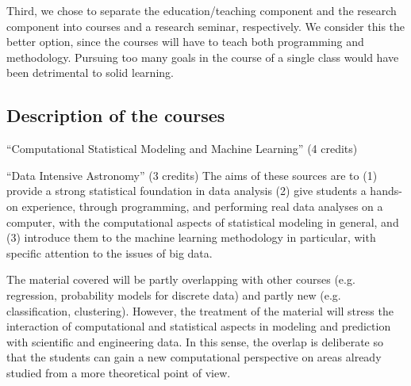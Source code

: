 Third, we chose to separate the education/teaching component and the
research component into courses and a research seminar, respectively. We
consider this the better option, since the courses will have to teach
both programming and methodology. Pursuing too many goals in the
course of a single class would have been detrimental to solid learning.
 

\subsection{Description of the courses}
\label{sec:course-descr}

\bits
\item \statcl 
``Computational Statistical Modeling and Machine Learning'' (4 credits)
\item \astrocl ``Data Intensive Astronomy'' (3 credits)
\eits
The aims of these sources are to (1) provide a strong statistical
foundation in data analysis (2) give students a hands-on experience, through programming, and performing real data analyses on a computer, with the computational aspects of 
statistical modeling in general, and (3)  introduce them to the  machine learning methodology in particular, with specific attention to the issues of big data.

The material covered will be partly overlapping with other courses
(e.g. regression, probability models for discrete data) and partly new
(e.g. classification, clustering). However, the treatment of the
material will stress the interaction of computational and
statistical aspects in modeling and prediction with scientific and
engineering data. In this sense, the overlap is deliberate
so that the students can gain a new computational perspective on areas
already studied from a more theoretical point of view. 

